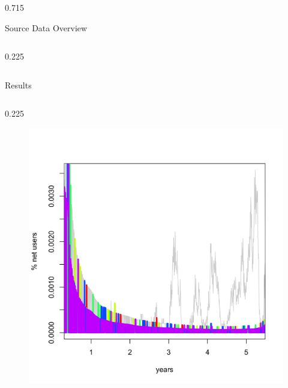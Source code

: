 \documentclass[final]{beamer} %
\newenvironment{oneCol}{\begin{column}[t]{0.225\paperwidth}}{\end{column}}
\newenvironment{threeCol}{\begin{column}[t]{0.715\paperwidth}}{\end{column}}
\begin{document}
\begin{frame}{}
\begin{columns}[t]
\begin{threeCol}
\begin{block}{Source Data Overview}
\begin{columns}
\begin{oneCol}
\begin{figure}
      \end{figure}   
    \end{oneCol}
    \end{columns}
    \end{block}
    
    \begin{block}{Results}
    \begin{columns}
    \begin{oneCol}
      \begin{figure}
        \includegraphics[width=1.0\linewidth]{out1.png}
      \end{figure}
      \begin{figure}

\end{figure}
\end{oneCol}
\end{columns}
\end{block}
\end{threeCol}
\end{columns}
\end{frame}
\end{document}
